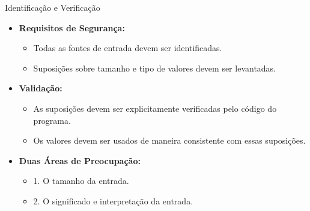 \begin{frame}{Identificação e Verificação}
    \begin{itemize}
        \item \textbf{Requisitos de Segurança:}
              \begin{itemize}
                  \item Todas as fontes de entrada devem ser identificadas.
                  \item Suposições sobre tamanho e tipo de valores devem ser levantadas.
              \end{itemize}

        \item \textbf{Validação:}
              \begin{itemize}
                  \item As suposições devem ser explicitamente verificadas pelo código do programa.
                  \item Os valores devem ser usados de maneira consistente com essas suposições.
              \end{itemize}

        \item \textbf{Duas Áreas de Preocupação:}
              \begin{itemize}
                  \item 1. O tamanho da entrada.
                  \item 2. O significado e interpretação da entrada.
              \end{itemize}
    \end{itemize}
\end{frame}

